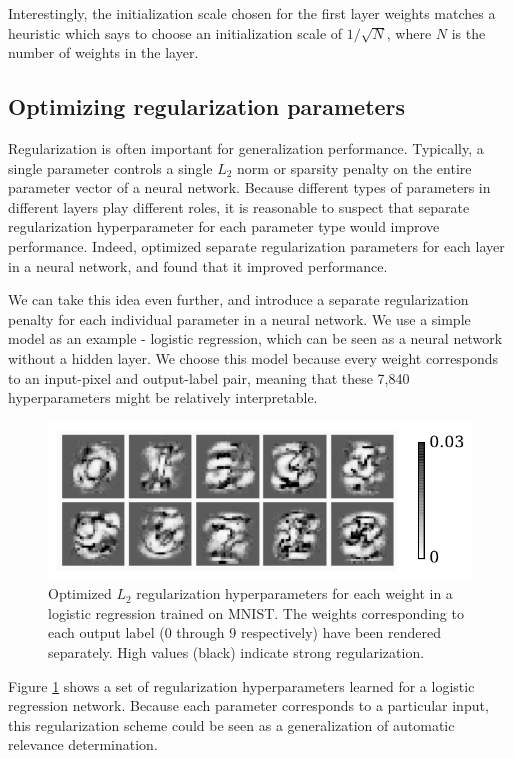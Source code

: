 \documentclass{article}
\begin{document}
Interestingly, the initialization scale chosen for the first layer weights matches a heuristic which says to choose an initialization scale of $1/\sqrt{N}$, where $N$ is the number of weights in the layer.

\subsection{Optimizing regularization parameters}
\label{sec:optimizing regularization}
Regularization is often important for generalization performance.
Typically, a single parameter controls a single $L_2$ norm or sparsity penalty on the entire parameter vector of a neural network.
Because different types of parameters in different layers play different roles, it is reasonable to suspect that separate regularization hyperparameter for each parameter type would improve performance.
Indeed, \citet{snoek2012practical} optimized separate regularization parameters for each layer in a neural network, and found that it improved performance.

We can take this idea even further, and introduce a separate regularization penalty for each individual parameter in a neural network.
We use a simple model as an example - logistic regression, which can be seen as a neural network without a hidden layer.
We choose this model because every weight corresponds to an input-pixel and output-label pair, meaning that these 7,840 hyperparameters might be relatively interpretable.
%
\begin{figure}[h!]
\begin{center}
\includegraphics[width=\columnwidth]{../experiments/Jan_21_nn_ard/2/penalties.pdf}
\caption{Optimized $L_2$ regularization hyperparameters for each weight in a logistic regression  trained on MNIST.
The weights corresponding to each output label (0 through 9 respectively) have been rendered separately.
High values (black) indicate strong regularization.}
\label{fig:logistic ard}
\end{center}
\end{figure} 
%
Figure \ref{fig:logistic ard} shows a set of regularization hyperparameters learned for a logistic regression network.
Because each parameter corresponds to a particular input, this regularization scheme could be seen as a generalization of automatic relevance determination.
\end{document}
